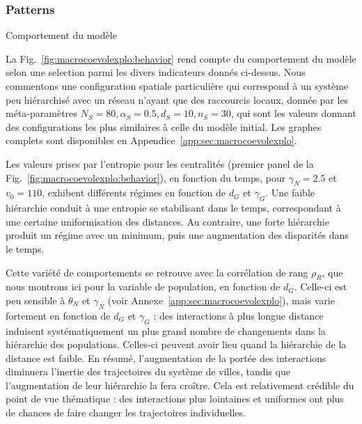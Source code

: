 \subsubsection{Patterns}{Comportement du modèle}



La Fig.~\ref{fig:macrocoevolexplo:behavior} rend compte du comportement du modèle selon une selection parmi les divers indicateurs donnés ci-dessus. Nous commentons une configuration spatiale particulière qui correspond à un système peu hiérarchisé avec un réseau n'ayant que des raccourcis locaux, donnée par les méta-paramètres $N_S=80,\alpha_S=0.5,d_S=10,n_S=30$, qui sont les valeurs donnant des configurations les plus similaires à celle du modèle initial. Les graphes complets sont disponibles en Appendice~\ref{app:sec:macrocoevolexplo}.


Les valeurs prises par l'entropie pour les centralités (premier panel de la Fig.~\ref{fig:macrocoevolexplo:behavior}), en fonction du temps, pour $\gamma_N = 2.5$ et $v_0 = 110$, exhibent différents régimes en fonction de $d_G$ et $\gamma_G$. Une faible hiérarchie conduit à une entropie se stabilisant dans le temps, correspondant à une certaine uniformisation des distances. Au contraire, une forte hiérarchie produit un régime avec un minimum, puis une augmentation des disparités dans le temps.


Cette variété de comportements se retrouve avec la corrélation de rang $\rho_R$, que nous montrons ici pour la variable de population, en fonction de $d_G$. Celle-ci est peu sensible à $\theta_N$ et $\gamma_N$ (voir Annexe~\ref{app:sec:macrocoevolexplo}), mais varie fortement en fonction de $d_G$ et $\gamma_G$ : des interactions à plus longue distance induisent systématiquement un plus grand nombre de changements dans la hiérarchie des populations. Celles-ci peuvent avoir lieu quand la hiérarchie de la distance est faible. En résumé, l'augmentation de la portée des interactions diminuera l'inertie des trajectoires du système de villes, tandis que l'augmentation de leur hiérarchie la fera croître. Cela est relativement crédible du point de vue thématique : des interactions plus lointaines et uniformes ont plus de chances de faire changer les trajectoires individuelles.


